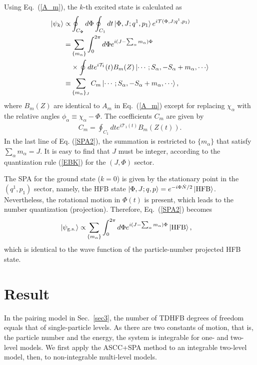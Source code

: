 \documentclass[11pt]{book} %
\begin{document}
Using Eq.~(\ref{A_m}),
the $k$-th excited state is calculated as
\begin{align}
\ket{\psi_k} \propto& \oint_{C_\Phi} d\Phi \oint_{C_1} dt
\ket{\Phi,J;q^1,p_1} e^{i\mathcal{T}(\Phi,J;q^1,p_1)}
 \nonumber \\
	=& \sum_{\{m_\alpha\}}
	\int_0^{2\pi} d\Phi e^{i(J-\sum_\alpha m_\alpha)\Phi} \nonumber \\
&\times \oint dt e^{i\mathcal{T}_1}(t) B_m (Z) \ket{\cdots;S_\alpha,-S_\alpha+m_\alpha,\cdots} \nonumber \\
 \equiv& \sum_{\{m_\alpha\}_J} C_m \ket{\cdots;S_\alpha,-S_\alpha+m_\alpha,\cdots},
 \label{SPA2}
\end{align}
where $B_m(Z)$ are identical to $A_m$ in Eq.~(\ref{A_m}) except for
replacing $\chi_\alpha$ with the relative angles
$\phi_\alpha\equiv\chi_\alpha-\Phi$.
The coefficients $C_m$ are given by
\begin{align}
C_m = \oint_{C_1} dt e^{i\mathcal{T}_1(t)} B_m(Z(t)).
  \label{coef}
\end{align}
In the last line of Eq. (\ref{SPA2}), the summation is restricted to
$\{m_\alpha\}$ that satisfy $\sum_\alpha m_\alpha=J$.
It is easy to find that $J$ must be integer,
according to the quantization rule (\ref{EBK}) for the $(J,\Phi)$ sector.

The SPA for the ground state ($k=0$) is given by the stationary point
in the $(q^1,p_1)$ sector,
namely, the HFB state $\ket{\Phi,J;q,p}=e^{-i\Phi\hat{N}/2}\ket{\rm HFB}$.
Nevertheless, the rotational motion in $\Phi(t)$ is present,
which leads to the number quantization (projection).
Therefore, Eq.~(\ref{SPA2}) becomes
\begin{align}
	\ket{\psi_{\rm g.s.}} \propto& \sum_{\{m_\alpha\}}
	\int_0^{2\pi} d\Phi e^{i(J-\sum_\alpha m_\alpha)\Phi}
	\ket{\rm HFB},  
	\label{SPA3}
\end{align}
which is identical to the wave function of the particle-number projected HFB state.


\section{Result}
In the pairing model in Sec.~\ref{sec3},
the number of TDHFB degrees of freedom equals that of single-particle levels.
As there are two constants of motion, that is, the particle number and 
the energy, the system is integrable for one- and two-level models.
We first apply the ASCC+SPA method to an integrable two-level model,
then, to non-integrable multi-level models.
\end{document}
